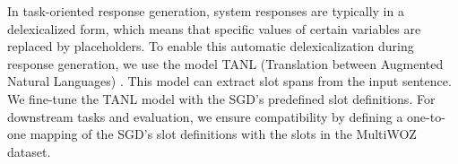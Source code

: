 In task-oriented response generation, system responses are typically in a delexicalized form, which means that specific values of certain variables are replaced by placeholders. 
To enable this automatic delexicalization during response generation, we use the model TANL (Translation between Augmented Natural Languages) \cite{tanl}. 
This model can extract slot spans from the input sentence.
We fine-tune the TANL model with the SGD's predefined slot definitions.
For downstream tasks and evaluation, we ensure compatibility by defining a one-to-one mapping of the SGD's slot definitions with the slots in the MultiWOZ dataset.

\begin{table*}[t]
    \centering
    \caption{Low-resource experimental results. All experiments are done in the policy optimization setting. For few-shot, we fine-tuned the model with 50 examples.}
    \label{tab:low-resource}
\end{table*}

